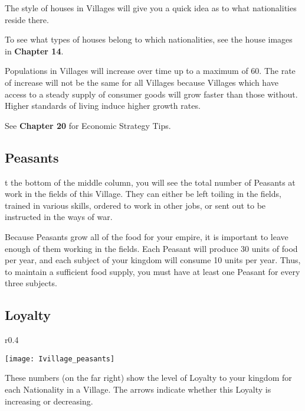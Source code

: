 The style of houses in Villages will give you a quick idea as to what nationalities reside there.

To see what types of houses belong to which nationalities, see the house images in \textbf{Chapter 14}.

Populations in Villages will increase over time up to a maximum of 60. The rate of increase will not be the same for all Villages because Villages which have access to a steady supply of consumer goods will grow faster than those without. Higher standards of living induce higher growth rates.

See \textbf{Chapter 20} for Economic Strategy Tips.

\subsection{\textsf{Peasants}}


t the bottom of the middle column, you will see the total number of Peasants at work in the fields of this Village. They can either be left toiling in the fields, trained in various skills, ordered to work in other jobs, or sent out to be instructed in the ways of war.

Because Peasants grow all of the food for your empire, it is important to leave enough of them working in the fields. Each Peasant will produce 30 units of food per year, and each subject of your kingdom will consume 10 units per year. Thus, to maintain a sufficient food supply, you must have at least one Peasant for every three subjects.

\subsection{\textsf{Loyalty}}


\begin{wrapfigure}{r}{0.4\textwidth}
    \vspace{-20pt}
    \begin{center}
        \texttt{[image: Ivillage\_peasants]} %
    \end{center}
    \vspace{-20pt}
\end{wrapfigure}

These numbers (on the far right) show the level of Loyalty to your kingdom for each Nationality in a Village. The arrows indicate whether this Loyalty is increasing or decreasing.

